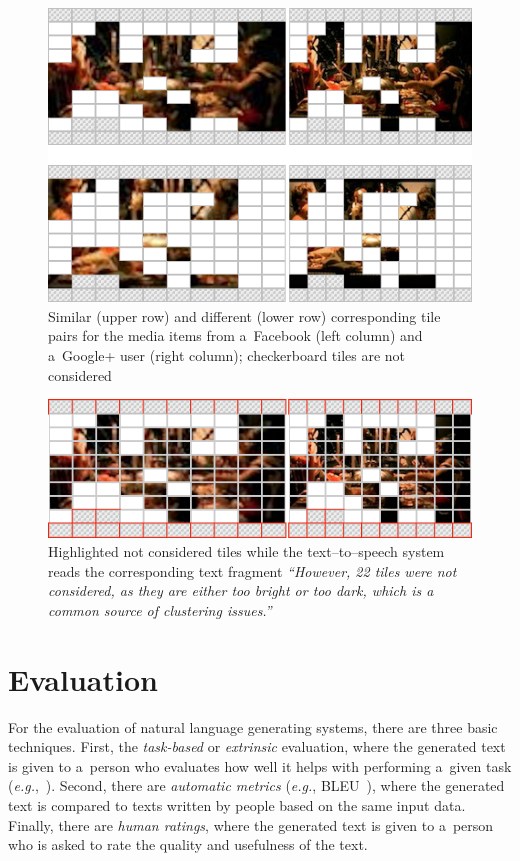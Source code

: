 \documentclass{article}
\begin{document}
\begin{figure}[t!]
  \centering
  \includegraphics[width=0.75\linewidth]{./similar-different.png}
  \caption{Similar (upper row) and different (lower row) corresponding tile pairs for the media items from a~Facebook (left column) and a~Google+ user (right column); checkerboard tiles are not considered}
  \label{fig:similar-different}
\end{figure}

\begin{figure}[t!]
  \centering
  \includegraphics[width=0.8\linewidth]{./tile-highlight.png}
  \caption{Highlighted not considered tiles
    while the text--to--speech system reads the corresponding text fragment
    \textit{``However, 22 tiles were not considered,
    as they are either too bright or too dark,
    which is a common source of clustering issues.''}}
  \label{fig:tile-highlight}
\end{figure}

\section{Evaluation}
\label{sec:evaluation}

For the evaluation of natural language generating systems,
there are three basic techniques.
First, the \emph{task-based} or \emph{extrinsic} evaluation,
where the generated text is given to a~person
who evaluates how well it helps with performing a~given task
(\emph{e.g.},~\cite{portet2009nlg}).
Second, there are \emph{automatic metrics}
(\emph{e.g.}, BLEU~\cite{papineni2002bleu}),
where the generated text is compared to texts written by people
based on the same input data.
Finally, there are \emph{human ratings}, where the generated text
is given to a~person who is asked to rate
the quality and usefulness of the text.
\end{document}
